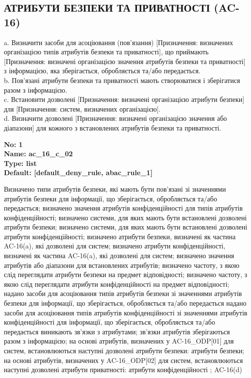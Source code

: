 \documentclass{article}
\begin{document}
\subsection{АТРИБУТИ БЕЗПЕКИ ТА ПРИВАТНОСТІ (AC-16)}
a. Визначити засоби для асоціювання (пов'язання) [Призначення: визначених організацією типів атрибутів безпеки та приватності], що приймають [Призначення: визначені організацією значення атрибутів безпеки та приватності] з інформацією, яка зберігається, обробляється та/або передається.\\ 
b. Пов'язані атрибути безпеки та приватності мають створюватися і зберігатися разом з інформацією.\\ 
c. Встановити дозволені [Призначення: визначені організацією атрибути безпеки] для [Призначення: систем, визначених організацією].\\ 
d. Визначити дозволені [Призначення: визначені організацією значення або діапазони] для кожного з встановлених атрибутів безпеки та приватності.

\vspace{10pt}
{\footnotesize\bfseries
No: 1\\
Name: ac\_\allowbreak{}16\_\allowbreak{}c\_\allowbreak{}02\\
Type: list\\
Default: [\textquotedbl{}default\_\allowbreak{}deny\_\allowbreak{}rule\textquotedbl{}, \textquotedbl{}abac\_\allowbreak{}rule\_\allowbreak{}1\textquotedbl{}]
}

{\footnotesize Визначено типи атрибутів безпеки, які мають бути пов'язані зі значеннями атрибутів безпеки для інформації, що зберігається, обробляється та/або передається; визначено значення атрибутів конфіденційності для типів атрибутів конфіденційності; визначено системи, для яких мають бути встановлені дозволені атрибути безпеки; визначено системи, для яких мають бути встановлені дозволені атрибути конфіденційності; визначено атрибути безпеки, визначені як частина AC-16(a), які дозволені для систем; визначено атрибути конфіденційності, визначені як частина AC-16(a), які дозволені для систем; визначено значення атрибутів або діапазони для встановлених атрибутів; визначено частоту, з якою слід переглядати атрибути безпеки на предмет відповідності; визначено частоту, з якою слід переглядати атрибути конфіденційності на предмет відповідності; надано засоби для асоціювання типів атрибутів безпеки зі значеннями атрибутів безпеки для інформації, що зберігається, обробляється та/або передається надано засоби для асоціювання типів атрибутів конфіденційності зі значеннями атрибутів конфіденційності для інформації, що зберігається, обробляється та/або передається виникають зв'язки з атрибутами; зв'язки атрибутів зберігаються разом з інформацією; на основі атрибутів, визначених у AC-16\_\allowbreak{}ODP[01] для систем, встановлюються наступні дозволені атрибути безпеки: атрибути безпеки; на основі атрибутів, визначених у AC-16\_\allowbreak{}ODP[02] для систем, встановлюються наступні дозволені атрибути приватності: атрибути конфіденційності ; AC-16(d)}
\end{document}
